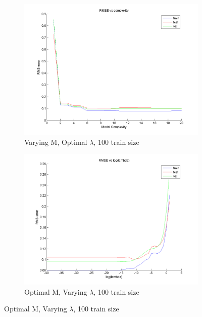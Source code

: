 \documentclass{article}
\begin{document}
\begin{figure}[H]
\begin{subfigure}{.5\textwidth}
\centering
\includegraphics[width=\linewidth]{RMS_complexity_100}
\caption{Varying M, Optimal $\lambda$, 100 train size}
\end{subfigure}
\begin{subfigure}{.5\textwidth}
\includegraphics[width=\linewidth]{RMS_lambda_100}
\caption{Optimal M, Varying $\lambda$, 100 train size}
\end{subfigure}


\end{figure}
\end{document}
